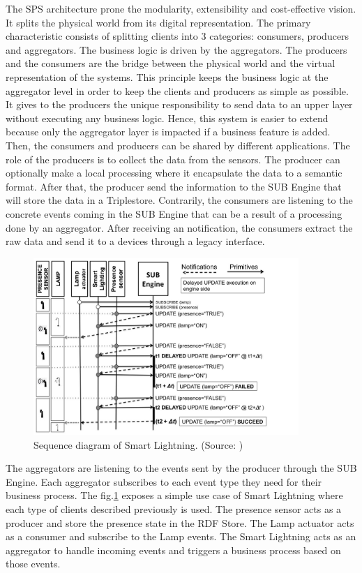 \documentclass[11pt]{article}
\begin{document}
The SPS architecture prone the modularity, extensibility and cost-effective vision. It splits the physical world from its digital representation. The primary characteristic consists of splitting clients into 3 categories: consumers, producers and aggregators. The business logic is driven by the aggregators. The producers and the consumers are the bridge between the physical world and the virtual representation of the systems. This principle keeps the business logic at the aggregator level in order to keep the clients and producers as simple as possible. It gives to the producers the unique responsibility to send data to an upper layer without executing any business logic. Hence, this system is easier to extend because only the aggregator layer is impacted if a business feature is added. Then, the consumers and producers can be shared by different applications.
\newline
\newline
The role of the producers is to collect the data from the sensors. The producer can optionally make a local processing where it encapsulate the data to a semantic format. After that, the producer send the information to the SUB Engine that will store the data in a Triplestore.
Contrarily, the consumers are listening to the concrete events coming in the SUB Engine that can be a result of a processing done by an aggregator. After receiving an notification, the consumers extract the raw data and send it to a devices through a legacy interface.
\begin{figure}[H]
	\includegraphics[width=\textwidth,height=190pt]{assets/simple_SPS_example.png}
	\caption[Sequence diagram of Smart Lightning]{
	Sequence diagram of Smart Lightning. (Source: \cite{A-Semantic-Publish-Subscribe-Architecture})}
	\label{fig:Sequence-diagram-of-Smart-Lightning}
\end{figure}
The aggregators are listening to the events sent by the producer through the SUB Engine. Each aggregator subscribes to each event type they need for their business process. The fig.\ref{fig:Sequence-diagram-of-Smart-Lightning} exposes a simple use case of Smart Lightning where each type of clients described previously is used. The presence sensor acts as a producer and store the presence state in the RDF Store. The Lamp actuator acts as a consumer and subscribe to the Lamp events. The Smart Lightning acts as an aggregator to handle incoming events and triggers a business process based on those events.
\end{document}
